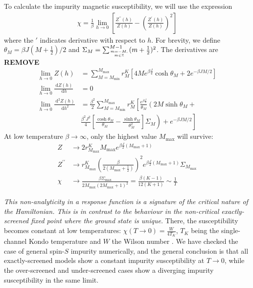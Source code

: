 \documentclass[reprint,prb,superscriptaddress]{revtex4-2}
\begin{document}
To calculate the impurity magnetic susceptibility, we will use the expression
\begin{align}
	\chi = \frac{1}{\beta}\lim_{h \to 0}\left[\frac{Z^{\prime\prime}(h)}{Z(h)} - \left(\frac{Z^{\prime}(h)}{Z(h)}\right)^2 \right] 
\end{align}
where the \(\prime\) indicates derivative with respect to \(h\). For brevity, we define \(\theta_M = \beta J (M+\frac{1}{2})/2\) and \(\Sigma_M = \sum_{m=-M, \atop{m\in \mathbb{Z}}}^{M-1}(m+\frac{1}{2})^2\). The derivatives are \textbf{REMOVE}
\begin{align}
	\lim_{h \to 0}Z(h) &= \sum_{M=M_\text{min}}^{M_\text{max}}r^K_M\left[4Me^{\beta \frac{J}{4}}\cosh \theta_M + 2e^{-\beta JM/2}\right]\\
	\lim_{h \to 0}\frac{\:\mathrm{d}Z(h)}{\:\mathrm{d}h} &=  0\\
	\lim_{h \to 0}\frac{\:\mathrm{d}^2Z(h)}{\:\mathrm{d}h^2} &= \frac{\beta^2}{2}\sum_{M=M_\text{min}}^{M_\text{max}}r^K_M\left[\frac{e^{\beta \frac{J}{4}}}{\theta_M}\left(2M\sinh \theta_M + \right.\right.\nonumber\\
								 &\left.\left.\frac{\beta^2 J^2}{4}\left[\frac{\cosh\theta_M}{\theta_M} - \frac{\sinh \theta_M}{\theta_M^2}\right]\Sigma_M\right)+ e^{-\beta JM/2}\right]
\end{align}
At low temperature \(\beta \to \infty\), only the highest value \(M_\text{max}\) will survive:
\begin{align}
	Z &\to 2 r^K_{M_\text{max}} M_\text{max} e^{\beta \frac{J}{2}(M_\text{max} + 1)}\\
	Z^{\prime \prime} &\to r^K_{M_\text{max}}\left(\frac{\beta }{2(M_\text{max} + \frac{1}{2})}\right)^2 e^{\beta \frac{J}{2}(M_\text{max} + 1)}\Sigma_{M_\text{max}}\\
	\chi &\to \frac{\beta\Sigma_\text{max}}{2M_\text{max}\left(2M_\text{max}+1\right)^2} = \frac{\beta(K-1)}{12(K+1)} \sim \frac{1}{T}
\end{align}

\textit{This non-analyticity in a response function is a signature of the critical nature of the Hamiltonian. This is in contrast to the behaviour in the non-critical exactly-screened fixed point where the ground state is unique.} There, the susceptibility becomes constant at low temperatures: \(\chi(T\to 0) = \frac{W}{4 T_K}\), \(T_K\) being the single-channel Kondo temperature and \(W\) the Wilson number \cite{wilson1975renormalization,nozieres1974fermi,bullaNRGreview,kondo_urg}. We have checked the case of general spin-\(S\) impurity numerically, and the general conclusion is that all exactly-screened models show a constant impurity susceptibility at \(T \to 0\), while the over-screened and under-screened cases show a diverging impurity susceptibility in the same limit. 
\end{document}
